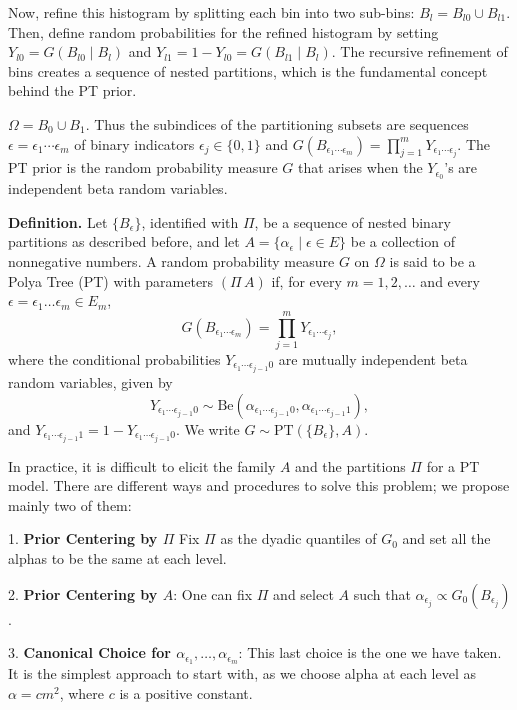 \documentclass{article}
\begin{document}
Now, refine this histogram by splitting each bin into two sub-bins: \( B_l = B_{l0} \cup B_{l1} \). Then, define random probabilities for the refined histogram by setting \( Y_{l0} = G(B_{l0} \mid B_l) \) and \( Y_{l1} = 1 - Y_{l0} = G(B_{l1} \mid B_l) \). The recursive refinement of bins creates a sequence of nested partitions, which is the fundamental concept behind the PT prior.

\( \Omega = B_0 \cup B_1 \). Thus the subindices of the partitioning subsets are sequences 
\( \epsilon = \epsilon_1 \cdots \epsilon_m \) of binary indicators \( \epsilon_j \in \{0, 1\} \) and 
\( G(B_{\epsilon_1 \cdots \epsilon_m}) = \prod_{j=1}^m Y_{\epsilon_1 \cdots \epsilon_j} \). 
The PT prior is the random probability measure \( G \) that arises when the \( Y_{\epsilon_0} \)'s 
are independent beta random variables.
\bigskip

\textbf{Definition.} Let \(\{B_{\epsilon}\}\), identified with \( \Pi\), be a sequence of nested binary partitions as described before, and let \( A = \{\alpha_{\epsilon} \mid \epsilon \in E \} \) be a collection of nonnegative numbers. A random probability measure \( G \) on \( \Omega \) is said to be a Polya Tree (PT) with parameters \((\Pi\, A)\) if, for every \( m = 1, 2, \ldots \) and every \( \epsilon = \epsilon_1 \ldots \epsilon_m \in E_m \),
\[
G(B_{\epsilon_1 \cdots \epsilon_m}) = \prod_{j=1}^m Y_{\epsilon_1 \cdots \epsilon_j},
\]
where the conditional probabilities \( Y_{\epsilon_1 \cdots \epsilon_{j-1} 0} \) are mutually independent beta random variables, given by
\[
Y_{\epsilon_1 \cdots \epsilon_{j-1} 0} \sim \text{Be}(\alpha_{\epsilon_1 \cdots \epsilon_{j-1} 0}, \alpha_{\epsilon_1 \cdots \epsilon_{j-1} 1}),
\]
and \( Y_{\epsilon_1 \cdots \epsilon_{j-1} 1} = 1 - Y_{\epsilon_1 \cdots \epsilon_{j-1} 0} \). We write \( G \sim \text{PT}(\{B_{\epsilon}\}, A) \).

\bigskip
In practice, it is difficult to elicit the family \( A \) and the partitions \( \Pi \) for a PT model. There are different ways and procedures to solve this problem; we propose mainly two of them:

1. \textbf{Prior Centering by \( \Pi \)} Fix \( \Pi \) as the dyadic quantiles of \( G_0 \) and set all the alphas to be the same at each level.

2. \textbf{Prior Centering by \( A \)}: One can fix \( \Pi \) and select \( A \) such that \( \alpha_{\epsilon_j} \propto G_0(B_{\epsilon_j}) \).

3. \textbf{Canonical Choice for \( \alpha_{\epsilon_1}, \ldots, \alpha_{\epsilon_m} \)}: This last choice is the one we have taken. It is the simplest approach to start with, as we choose alpha at each level as \( \alpha = c m^2 \), where \( c \) is a positive constant.
\end{document}
